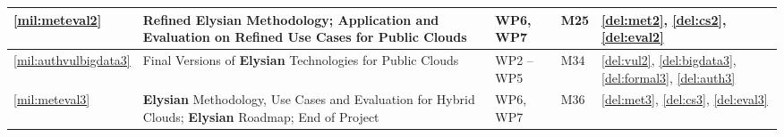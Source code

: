 \documentclass[a4paper,11pt]{article}
\newcommand{\project}[1]{\textbf{#1}\xspace}
\newcommand{\SECURITY}{\project{Elysian}}
\newcommand{\TheProject}{\SECURITY}
\begin{document}
\begin{minipage}{\textwidth}
\begin{center}
\begin{tabular*}{\textwidth}{|p{1cm}|p{10.3cm}|p{1.2cm}|p{0.6cm}|p{2.7cm}|}
   \hline
   \ref{mil:meteval2} & Refined \TheProject{} Methodology; Application and Evaluation on Refined Use Cases for Public Clouds & WP6, WP7 & M25 & \ref{del:met2}, \ref{del:cs2}, \ref{del:eval2} \\
   \hline
   \ref{mil:authvulbigdata3} & Final Versions of \TheProject{} Technologies for Public Clouds & WP2 -- WP5 & M34 & \ref{del:vul2}, \ref{del:bigdata3}, \ref{del:formal3}, \ref{del:auth3} \\
   \hline
   \ref{mil:meteval3} & \TheProject{} Methodology, Use Cases and Evaluation for Hybrid Clouds; \TheProject{} Roadmap; End of Project & WP6, WP7 & M36 & \ref{del:met3}, \ref{del:cs3}, \ref{del:eval3} \\
   \hline
   
\end{tabular*}
\end{center}
\end{minipage}
\end{document}
